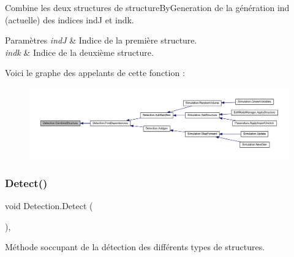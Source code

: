 Combine les deux structures de structure\+By\+Generation de la génération ind (actuelle) des indices indJ et indk. 


\begin{DoxyParams}{Paramètres}
{\em indJ} & Indice de la première structure.\\
\hline
{\em indk} & Indice de la deuxième structure.\\
\hline
\end{DoxyParams}
Voici le graphe des appelants de cette fonction \+:
\nopagebreak
\begin{figure}[H]
\begin{center}
\leavevmode
\includegraphics[width=350pt]{class_detection_a7a133b5ef43e949260afb4685766e0ca_icgraph}
\end{center}
\end{figure}
\mbox{\label{class_detection_a2d43ae8dc03c4247fd0d39787b72213a}} 
\subsubsection{\texorpdfstring{Detect()}{Detect()}}
{\footnotesize\ttfamily void Detection.\+Detect (\begin{DoxyParamCaption}{ }\end{DoxyParamCaption})\hspace{0.3cm}{\ttfamily [inline]}, {\ttfamily [private]}}



Méthode s\textquotesingle{}occupant de la détection des différents types de structures. 

